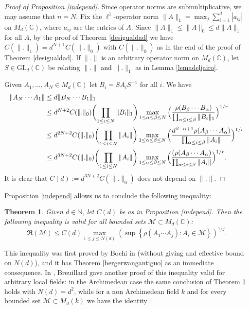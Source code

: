 \documentclass[JEP,XML,SOM,Unicode,NoEqCountersInSection]{cedram}
\let\mathcal\mathscr
\theoremstyle{plain}
\newtheorem{teo}{Theorem}[section]
\theoremstyle{definition}
\newcommand{\NN}{\mathbb{N}}
\newcommand{\CC}{\mathbb{C}}
\newcommand{\corchete}[1]{\left\{{#1}\right\}}
\begin{document}
\begin{proof}[Proof of Proposition \ref{independ}]
Since operator norms are submultiplicative, we may assume that $n=N$. Fix the $\ell^1$-operator norm $\|A\|_{1}=\max_{j}{\sum_{i=1}^{d}|a_{ij}|}$ on $M_{d}(\CC)$, where $a_{ij}$ are the entries of $A$. Since $\|A\|_1 \leq \|A\|_0 \leq d\|A\|_1$ for all $A$, by the proof of Theorem \ref{desigualdad} we have $C(\|.\|_1)=d^{N+1}C(\|.\|_0)$ with $C(\|.\|_0)$ as in the end of the proof of Theorem \ref{desigualdad}. If $\|.\|$ is an arbitrary operator norm on $M_{d}(\CC)$, let $S\in \mathrm{GL}_{d}(\CC)$ be relating $\|.\|$ and $\|.\|_{1}$ as in Lemma \ref{lemadeljairo}.

Given $A_{1},\dots,A_{N}\in M_{d}(\CC)$ let $B_{i}=SA_{i}S^{-1}$ for all $i$. We have
\begin{equation*}
\begin{split}
\|A_N\cdots A_1\| & \leq d\|B_N\cdots B_1\|_{1} \\
& \leq d^{N+2}C(\|.\|_0) \biggl(\prod_{1\leq i\leq N}{\|B_i\|_1}\biggr)\max_{1\leq \alpha\leq \beta\leq N}{ \Bigl( \frac{\rho(B_{\beta}\cdots B_{\alpha}) }{ \prod_{\alpha\leq i\leq \beta}{\|B_i\|_1}} \Bigr)^{1/r}} \\
& \leq d^{2N+2}C(\|.\|_0)\biggl(\prod_{1\leq i\leq N}{\|A_i\|}\biggr)\max_{1\leq \alpha\leq \beta\leq N}{ \Bigl( \frac{{d}^{\beta-\alpha+1}\rho(A_{\beta}\cdots A_{\alpha}) }{ \prod_{\alpha\leq i\leq \beta}{\|A_i\|}} \Bigr)^{1/r}} \\
& \leq d^{3N+2}C(\|.\|_0)\biggl(\prod_{1\leq i\leq N}{\|A_i\|}\biggr)\max_{1\leq \alpha\leq \beta\leq N}{ \Bigl( \frac{(\rho(A_{\beta}\cdots A_{\alpha}) }{ \prod_{\alpha\leq i\leq \beta}{\|A_i\|}} \Bigr)^{1/r}}.
\end{split}
\end{equation*}
It is clear that $C(d):=d^{3N+2}C(\|.\|_0)$ does not depend on $\|.\|$.
\end{proof}
Proposition \ref{independ} allows us to conclude the following inequality:
\begin{teo}\label{detodos} Given $d\in \NN$, let $C(d)$ be as in Proposition \ref{independ}. Then the following inequality is valid for all bounded sets $\mathcal{M}\subset M_{d}(\mathbb{C})$:
\begin{equation*}
\mathfrak{R}(\mathcal{M})\leq C(d)\max_{1\leq j\leq N(d)}{\left(\sup\corchete{\rho(A_{1}\cdots A_{j}) : A_{i}\in \mathcal{M}}\right)^{1/j}}.
\end{equation*}
\end{teo}
This inequality was first proved by Bochi in \cite{bociineq} (without giving and effective bound on $N(d)$), and it has Theorem \ref{bergerwangantiguo} as an immediate consequence. In \cite[Lem.\,2.1]{bro}, Breuillard gave another proof of this inequality valid for arbitrary local fields: in the Archimedean case the same conclusion of Theorem \ref{detodos} holds with $N(d)=d^2$, while for a non Archimedean field $k$ and for every bounded set $\mathcal{M}\subset M_d(k)$ we have the identity
\end{document}
